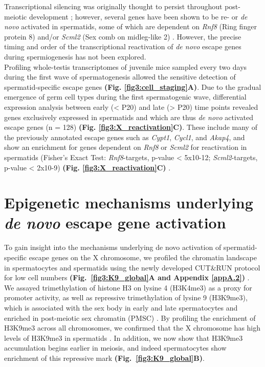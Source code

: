Transcriptional silencing was originally thought to persist throughout post-meiotic development \citep{Greaves2006, Turner2006}; however, several genes have been shown to be re- or \emph{de novo} activated in spermatids, some of which are dependent on \textit{Rnf8} (Ring finger protein 8) and/or \textit{Scml2} (Sex comb on midleg-like 2) \citep{Hasegawa2015, Sin2012, Sin2015}. However, the precise timing and order of the transcriptional reactivation of \emph{de novo} escape genes during spermiogenesis has not been explored. \\
Profiling whole-testis transcriptomes of juvenile mice sampled every two days during the first wave of spermatogenesis allowed the sensitive detection of spermatid-specific escape genes \textbf{(Fig. \ref{fig3:cell_staging}A)}. Due to the gradual emergence of germ cell types during the first spermatogenic wave, differential expression analysis between early (< P20) and late (> P20) time points revealed genes exclusively expressed in spermatids and which are thus \emph{de novo} activated escape genes (n = 128) \textbf{(Fig. \ref{fig3:X_reactivation}C)}. These include many of the previously annotated escape genes such as \textit{Cypt1}, \textit{Cycl1}, and \textit{Akap4}, and show an enrichment for genes dependent on \textit{Rnf8} or \textit{Scml2} for reactivation in spermatids (Fisher's Exact Test: \textit{Rnf8}-targets, p-value < 5x10-12; \textit{Scml2}-targets, p-value < 2x10-9) \textbf{(Fig. \ref{fig3:X_reactivation}C)} \citep{Adams2018}. 

\newpage

\section{Epigenetic mechanisms underlying \emph{de novo} escape gene activation}

To gain insight into the mechanisms underlying de novo activation of spermatid-specific escape genes on the X chromosome, we profiled the chromatin landscape in spermatocytes and spermatids using the newly developed CUT\&{}RUN protocol for low cell numbers \textbf{(Fig.~\ref{fig3:K9_global}A and Appendix \ref{appA.2})} \citep{Skene2018}. \\

We assayed trimethylation of histone H3 on lysine 4 (H3K4me3) as a proxy for promoter activity, as well as repressive trimethylation of lysine 9 (H3K9me3), which is associated with the sex body in early and late spermatocytes and enriched in post-meiotic sex chromatin (PMSC) \citep{Greaves2006, Tachibana2007}. By profiling the enrichment of H3K9me3 across all chromosomes, we confirmed that the X chromosome has high levels of H3K9me3 in spermatids \citep{Moretti2016}. In addition, we now show that H3K9me3 accumulation begins earlier in meiosis, and indeed spermatocytes show enrichment of this repressive mark \textbf{(Fig.~\ref{fig3:K9_global}B)}. 

